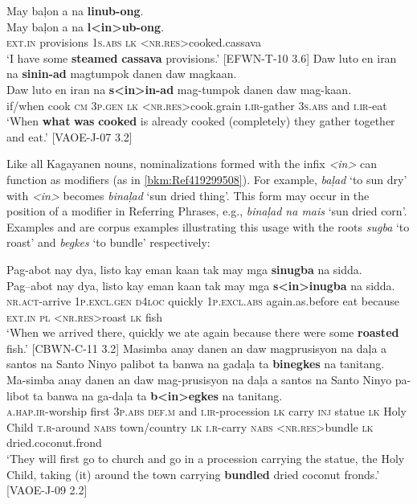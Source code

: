 \ea
\label{bkm:Ref419299508}
May  baļon  a  na  \textbf{linub-ong}. \\\smallskip
 \gll May  baļon  a  na  \textbf{l<in>ub-ong}. \\
\textsc{ext.in}  provisions  1\textsc{s.abs}  \textsc{lk}  <\textsc{nr.res}>cooked.cassava \\
\glt ‘I have some \textbf{steamed} \textbf{cassava} provisions.’ [EFWN-T-10 3.6]
\z
\ea
\label{bkm:Ref419299510}
Daw  luto  en  iran  na  \textbf{sinin-ad} magtumpok  danen  daw magkaan. \\\smallskip
 \gll Daw  luto  en  iran  na  \textbf{s<in>in-ad} mag-tumpok  danen  daw mag-kaan. \\
if/when  cook  \textsc{cm}  3\textsc{p.gen}  \textsc{lk}  <\textsc{nr.res}>cook.grain
\textsc{i.ir}-gather  3\textsc{s.abs}  and \textsc{i.ir-}eat \\
\glt ‘When \textbf{what} \textbf{was} \textbf{cooked} is already cooked (completely) they gather together and eat.’ [VAOE-J-07 3.2]
\z

Like all Kagayanen nouns, nominalizations formed with the infix \textit{<in>} can function as modifiers (as in \ref{bkm:Ref419299508}). For example, \textit{baļad} ‘to sun dry’ with \textit{<in>} becomes \textit{binaļad} ‘sun dried thing’. This form may occur in the position of a modifier in Referring Phrases, e.g., \textit{binaļad na mais} ‘sun dried corn’. Examples  and  are corpus examples illustrating this usage with the roots \textit{sugba} ‘to roast’ and \textit{begkes} ‘to bundle’ respectively:

\ea
\label{bkm:Ref419378020}
Pag-abot  nay  dya,  listo  kay  eman kaan tak  may  mga  \textbf{sinugba}  na  sidda. \\\smallskip
 \gll Pag--abot  nay  dya,  listo  kay  eman kaan tak  may  mga  \textbf{s<in>inugba}  na  sidda. \\
\textsc{nr.act}-arrive  1\textsc{p.excl.gen}  \textsc{d}4\textsc{loc}  quickly  1\textsc{p.excl.abs}  again.as.before eat because  \textsc{ext.in}  \textsc{pl}  <\textsc{nr.res}>roast  \textsc{lk}  fish \\
\glt `When we arrived there, quickly we ate again because there were some \textbf{roasted} fish.’ [CBWN-C-11 3.2]
\z
\ea
\label{bkm:Ref51233639}
Masimba  anay  danen  an  daw  magprusisyon  na  daļa  a santos  na  Santo  Ninyo  palibot  ta  banwa  na  gadaļa ta \textbf{binegkes}  na  tanitang. \\\smallskip
 \gll Ma-simba  anay  danen  an  daw  mag-prusisyon  na  daļa  a santos  na  Santo  Ninyo  pa-libot  ta  banwa  na  ga-daļa ta \textbf{b<in>egkes}  na  tanitang. \\
\textsc{a.hap.ir}-worship  first  3\textsc{p.abs}  \textsc{def.m}  and  \textsc{i.ir}-procession  \textsc{lk}  carry  \textsc{inj} statue  \textsc{lk}  Holy  Child  \textsc{t.r}-around  \textsc{nabs}  town/country  \textsc{lk}  \textsc{i.r}-carry \textsc{nabs}
 <\textsc{nr.res}>bundle  \textsc{lk} dried.coconut.frond \\
\glt `They will first go to church and go in a procession carrying the statue, the Holy Child, taking (it) around the town carrying \textbf{bundled} dried coconut fronds.’ [VAOE-J-09 2.2]
\z

